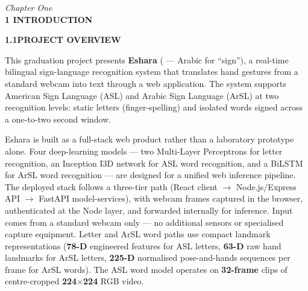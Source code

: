 \thispagestyle{plain}

\begin{center}
    \vspace*{0.5cm}
    {\large \textit{Chapter One}} \\[0.4cm]
    {\Large \textbf{1 \quad INTRODUCTION}}
\end{center}
\vspace{1in}

\normalsize
{}

\noindent\textbf{1.1\quad PROJECT OVERVIEW}\par
{}
\vspace{0.4cm}

\noindent This graduation project presents \textbf{Eshara} ( --- Arabic for ``sign''), a real-time bilingual sign-language recognition system that translates hand gestures from a standard webcam into text through a web application. The system supports American Sign Language (ASL) and Arabic Sign Language (ArSL) at two recognition levels: static letters (finger-spelling) and isolated words signed across a one-to-two second window.\par\vspace{0.4cm}

\noindent Eshara is built as a full-stack web product rather than a laboratory prototype alone. Four deep-learning models --- two Multi-Layer Perceptrons for letter recognition, an Inception I3D network for ASL word recognition, and a BiLSTM for ArSL word recognition --- are designed for a unified web inference pipeline. The deployed stack follows a three-tier path (React client $\rightarrow$ Node.js/Express API $\rightarrow$ FastAPI model-services), with webcam frames captured in the browser, authenticated at the Node layer, and forwarded internally for inference. Input comes from a standard webcam only --- no additional sensors or specialised capture equipment. Letter and ArSL word paths use compact landmark representations (\textbf{78-D} engineered features for ASL letters, \textbf{63-D} raw hand landmarks for ArSL letters, \textbf{225-D} normalised pose-and-hands sequences per frame for ArSL words). The ASL word model operates on \textbf{32-frame} clips of centre-cropped \textbf{224$\times$224} RGB video.\par\vspace{0.4cm}

